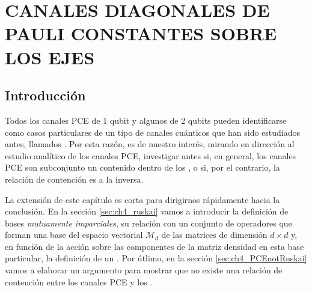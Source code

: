 \chapter{CANALES DIAGONALES DE PAULI CONSTANTES SOBRE LOS EJES}

\section{Introducción} %
Todos los canales PCE de 1 qubit y algunos de 2 qubits pueden identificarse como
casos particulares de un tipo de canales cuánticos que han sido 
estudiados antes, llamados
\ruskai{} \cite{nathanson2007pauli}. Por esta razón, es de nuestro interés,
mirando en dirección al estudio analítico de los canales PCE, investigar antes
si, en general, los canales PCE son subconjunto un contenido dentro de los 
\ruskai{}, o si, por el contrario, la relación de contención es a la inversa.

La extensión de este capítulo es corta para dirigirnos rápidamente 
hacia la conclusión. En la sección \ref{sec:ch4_ruskai} vamos a introducir la 
definición de bases \textit{mutuamente imparciales}, su relación con un
conjunto de operadores que forman una base del espacio vectorial $\mathcal{M}_d$
de las matrices de dimensión $d\times d$
y, en función de la acción sobre las componentes de la matriz densidad 
en esta base particular, la definición de un \ruskaiMap{}. Por útlimo, en la sección 
\ref{sec:ch4_PCEnotRuskai} vamos a elaborar un argumento para mostrar 
que no existe una relación de contención entre los canales PCE y los \ruskai{}.


